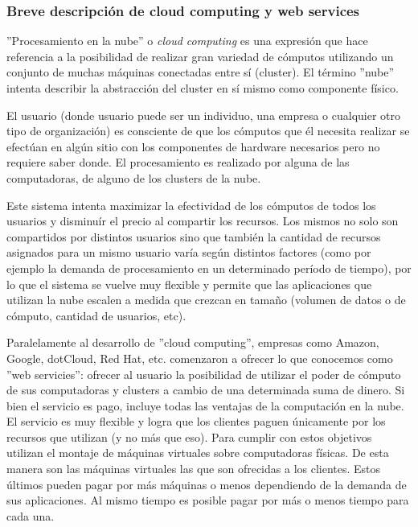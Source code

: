 \subsubsection{Breve descripción de cloud computing y web services}

''Procesamiento en la nube'' o \emph{cloud computing} es una expresión que hace referencia a la posibilidad de 
realizar gran variedad de cómputos utilizando un conjunto de muchas máquinas conectadas entre sí 
(cluster). El término ''nube'' intenta describir la abstracción del cluster en sí mismo como componente físico.

El usuario (donde usuario puede ser un individuo, una empresa o cualquier otro tipo de
organización) 
es consciente de que los cómputos que él necesita realizar se efectúan en algún sitio con los componentes
de hardware necesarios pero no requiere saber donde. El procesamiento es realizado por alguna de las computadoras,
de alguno de los clusters de la nube.

Este sistema intenta maximizar la efectividad de los cómputos de todos los usuarios 
y disminuír el precio al compartir los recursos.
Los mismos no solo son compartidos por distintos usuarios sino que también la cantidad de recursos asignados
para un mismo usuario varía según distintos factores (como por ejemplo la demanda de procesamiento en un
determinado período de tiempo), por lo que el sistema se vuelve muy flexible y permite que las aplicaciones
que utilizan la nube escalen a medida que crezcan en tama\~no (volumen de datos
o de cómputo, cantidad de usuarios, etc).

Paralelamente al desarrollo de ''cloud computing'', empresas como Amazon, Google, dotCloud, Red Hat, etc. comenzaron
a ofrecer lo que conocemos como ''web servicies'': ofrecer al usuario la posibilidad de utilizar el poder de cómputo
de sus computadoras y clusters a cambio de una determinada suma de dinero. Si bien el servicio es pago, incluye
todas las ventajas de la computación en la nube. El servicio es muy flexible y logra que los clientes paguen
únicamente por los recursos que utilizan (y no más que eso). Para cumplir con estos objetivos utilizan el montaje de
máquinas virtuales sobre computadoras físicas. De esta manera son las máquinas virtuales las que son ofrecidas
a los clientes. Estos últimos pueden pagar por más máquinas o menos dependiendo de la demanda de sus aplicaciones.
Al mismo tiempo es posible pagar por más o menos tiempo para cada una.

~


